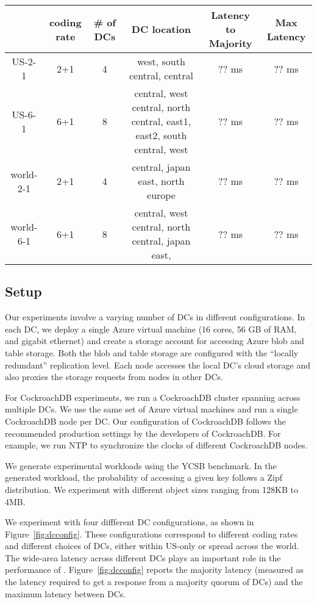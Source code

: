 \begin{figure*}
\begin{tabular}{c|c|c|c|c|c}
& coding rate & \# of DCs & DC location & Latency to Majority & Max Latency\\
\hline
US-2-1 & 2+1 & 4 & west, south central, central & ?? ms& ?? ms\\
US-6-1 & 6+1 & 8 & central, west central, north central, east1, east2, south central, west&?? ms&?? ms\\ 
world-2-1 & 2+1 & 4 & central, japan east, north europe &?? ms &?? ms\\
world-6-1 & 6+1 & 8 & central, west central, north central, japan east, &?? ms &?? ms\\
\end{tabular}
\caption{The DC configurations and inter-DC latencies in various experiments~\label{fig:dcconfig}} 
\end{figure*}

\subsection{Setup}
Our experiments involve a varying number of DCs in different configurations. In
each DC, we deploy a single Azure virtual machine (16 cores, 56 GB of RAM, and
gigabit ethernet) and create a storage account for accessing Azure blob and
table storage. Both the blob and table storage are configured with the
``locally redundant'' replication level.  Each \name node accesses the local
DC's cloud storage and also proxies the storage requests from \name nodes in
other DCs.  

For CockroachDB experiments, we run a CockroachDB cluster spanning across
multiple DCs.  We use the same set of Azure virtual machines and run a single
CockroachDB node per DC. Our configuration of CockroachDB follows the
recommended production settings by the developers of CockroachDB. For example,
we run NTP to synchronize the clocks of different CockroachDB nodes. 

We generate experimental workloads using the YCSB benchmark. In the generated
workload, the probability of accessing a given key follows a Zipf distribution.
We experiment with different object sizes ranging from 128KB to 4MB. 

We experiment with four diffferent DC configurations, as shown in
Figure~\ref{fig:dcconfig}.  These configurations correspond to different coding
rates and different choices of DCs, either within US-only or spread across the
world. The wide-area latency across different DCs plays an important role in 
the performance of \name.  Figure~\ref{fig:dcconfig} reports the majority
latency (measured as the latency required to get a response from a majority
quorum of DCs) and the maximum latency between DCs.

